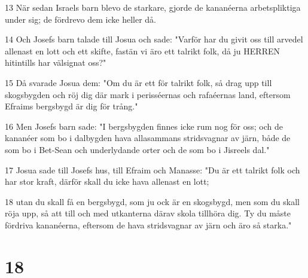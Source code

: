 \par 13 När sedan Israels barn blevo de starkare, gjorde de kananéerna arbetspliktiga under sig; de fördrevo dem icke heller då.
\par 14 Och Josefs barn talade till Josua och sade: "Varför har du givit oss till arvedel allenast en lott och ett skifte, fastän vi äro ett talrikt folk, då ju HERREN hitintills har välsignat oss?"
\par 15 Då svarade Josua dem: "Om du är ett för talrikt folk, så drag upp till skogsbygden och röj dig där mark i perisséernas och rafaéernas land, eftersom Efraims bergsbygd är dig för trång."
\par 16 Men Josefs barn sade: "I bergsbygden finnes icke rum nog för oss; och de kananéer som bo i dalbygden hava allasammans stridsvagnar av järn, både de som bo i Bet-Sean och underlydande orter och de som bo i Jisreels dal."
\par 17 Josua sade till Josefs hus, till Efraim och Manasse: "Du är ett talrikt folk och har stor kraft, därför skall du icke hava allenast en lott;
\par 18 utan du skall få en bergsbygd, som ju ock är en skogsbygd, men som du skall röja upp, så att till och med utkanterna därav skola tillhöra dig. Ty du måste fördriva kananéerna, eftersom de hava stridsvagnar av järn och äro så starka."

\chapter{18}

